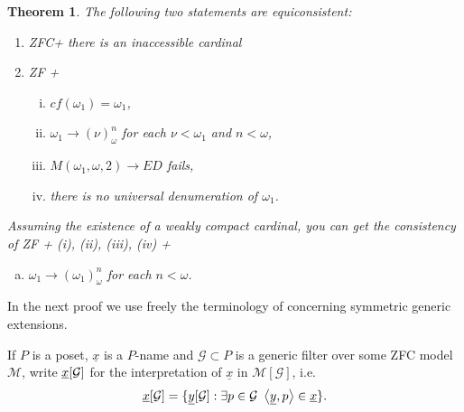 \documentclass[a4paper,10pt,reqno]{amsart}
\numberwithin{equation}{section}
\newtheorem{theorem}{Theorem}[section]
\theoremstyle{definition}
\theoremstyle{remark}
\newcommand{\mc}[1]{\mathcal{#1}}
\newcommand{\subs}{\subset}
\def\<{\left\langle}
\def\>{\right\rangle}
\begin{document}
\begin{theorem}\label{tm:model1}
The following two statements are equiconsistent:
\begin{enumerate}[(1)]
\item ZFC+ there is an inaccessible cardinal
\item 
ZF + 
\begin{enumerate}[(i)]
    \smallskip\item $cf({\omega}_1)={\omega}_1$,
\smallskip\item 
${\omega}_1\to ({\nu})^n_{\omega}$
for each ${\nu}<{\omega}_1$ and  $n<{\omega}$,
    \smallskip\item  $M({\omega}_1,{\omega},2)\to ED$ fails,
\smallskip\item there is no universal denumeration of ${\omega}_1$.
\end{enumerate}
\end{enumerate}    
Assuming the existence of a weakly compact cardinal, 
you can get the consistency of ZF + (i), (ii), (iii), (iv) +
\begin{enumerate}[(v)]
    \item ${\omega}_1\to ({\omega}_1)^n_{\omega}$ for each $n<{\omega}$.
\end{enumerate}
    \end{theorem}
    






In the next  proof we use freely the terminology of 
\cite[Chapter 17:Models in Which AC fails]{Halb2017} concerning symmetric generic extensions.  

If $P$ is a poset, $\underline x$ is a $P$-name and $\mc G\subs P$ is a generic filter over some 
ZFC model $\mc M$, write $\KKGU x$ for the interpretation of $\underline{x}$ in $\mc M[\mc G]$, i.e. 
\begin{displaymath}
    \KKGU x=\{\KKGU y: \exists p\in \mc G\ \<\underline{y},p\>\in \underline{x}\}.
\end{displaymath}
\end{document}
